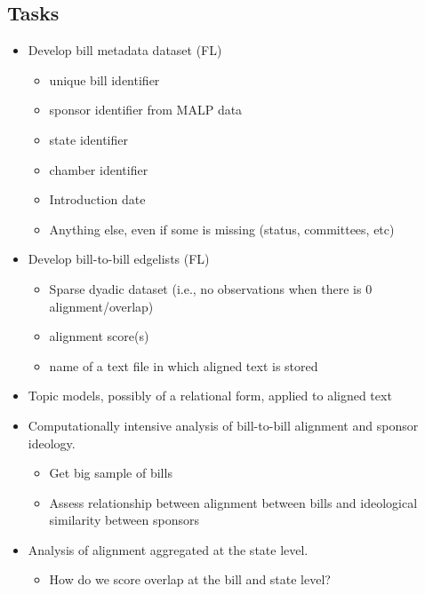 \documentclass[12pt]{article} %
\begin{document}
\subsection{Tasks}
\begin{itemize}
\item Develop bill metadata dataset (FL)
\begin{itemize}
\item unique bill identifier
\item sponsor identifier from  MALP data
\item state identifier
\item chamber identifier
\item Introduction date
\item Anything else, even if some is missing (status, committees, etc)
\end{itemize}
\item Develop bill-to-bill edgelists (FL)
\begin{itemize}
\item Sparse dyadic dataset (i.e., no observations when there is 0 alignment/overlap)
\item alignment score(s)
\item name of a text file in which aligned text is stored
\end{itemize}
\item Topic models, possibly of a relational form, applied to aligned text
\item Computationally intensive analysis of bill-to-bill alignment and sponsor ideology.
\begin{itemize}
\item Get big sample of bills
\item Assess relationship between alignment between bills and ideological similarity between sponsors
\end{itemize}
\item Analysis of alignment aggregated at the state level.
\begin{itemize}
\item How do we score overlap at the bill and state level?
\end{itemize}

\end{itemize}




\end{document}
